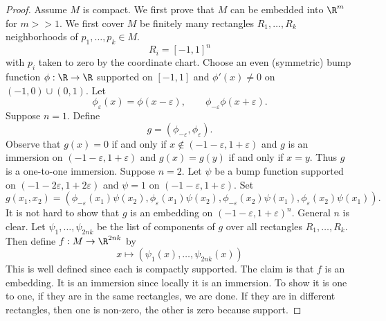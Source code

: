 \documentclass[reqno]{amsart}
\theoremstyle{definition}
\theoremstyle{remark}
\renewcommand{\epsilon}{\varepsilon}
\begin{document}
\begin{proof}
	Assume $M$ is compact. We first prove that $M$ can be embedded into $\R^m$ for $m >> 1$. We first cover $M$ be finitely many rectangles $R_1, \dots, R_k$ neighborhoods of $p_1, \dots, p_k \in M$.  
		\[ R_i = [-1, 1]^n \]
	with $p_i$ taken to zero by the coordinate chart. Choose an even (symmetric) bump function $\phi: \R \to \R$ supported on $[-1, 1]$ and $\phi'(x) \neq 0$ on $(-1, 0) \cup (0, 1)$. Let 
		\[ \phi_\epsilon (x) = \phi(x - \epsilon), \qquad \phi_{- \epsilon} \phi(x + \epsilon). \]
	Suppose $n = 1$. Define 
		\[ g = (\phi_{-\epsilon}, \phi_\epsilon).\]
	Observe that $g(x) = 0$ if and only if $x\not\in (-1 - \epsilon, 1 + \epsilon)$ and $g$ is an immersion on $(-1 - \epsilon, 1 + \epsilon)$ and $g(x) = g(y)$ if and only if $x = y$. Thus $g$ is a one-to-one immersion. 
	Suppose $n = 2$. Let $\psi$ be a bump function supported on $(-1 - 2\epsilon, 1 + 2 \epsilon)$ and $\psi = 1$ on $(- 1 - \epsilon, 1 + \epsilon)$. Set
		\[ g(x_1, x_2) = (\phi_{-\epsilon}(x_1) \psi (x_2), \phi_\epsilon (x_1) \psi(x_2), \phi_{-\epsilon} (x_2) \psi(x_1), \phi_\epsilon (x_2) \psi(x_1)). \]
	It is not hard to show that $g$ is an embedding on $(-1 - \epsilon, 1 + \epsilon)^n$. General $n$ is clear. Let $\psi_1, \dots, \psi_{2nk}$ be the list of components of $g$ over all rectangles $R_1, \dots, R_k$. Then define $f: M \to \R^{2nk}$ by 
		\[ x \mapsto (\psi_1 (x), \dots, \psi_{2nk} (x)) \]
	This is well defined since each is compactly supported. The claim is that $f$ is an embedding. It is an immersion since locally it is an immersion. To show it is one to one, if they are in the same rectangles, we are done. If they are in different rectangles, then one is non-zero, the other is zero because support. 
\end{proof}
\end{document}
